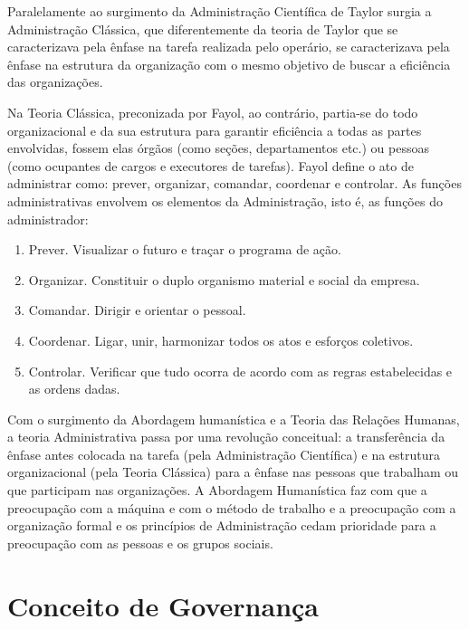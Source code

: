 Paralelamente ao surgimento da Administração Científica de Taylor surgia a 
Administração Clássica, que diferentemente da teoria de Taylor que se caracterizava
pela ênfase na tarefa realizada pelo operário, se caracterizava pela ênfase na 
estrutura da organização com o mesmo objetivo de buscar a eficiência das
organizações.

Na Teoria Clássica, preconizada por Fayol, ao contrário, partia-se do todo 
organizacional e da sua estrutura para garantir eficiência a todas as partes 
envolvidas, fossem elas órgãos (como seções, departamentos etc.) ou pessoas 
(como ocupantes de cargos e executores de tarefas).
%
Fayol define o ato de administrar como: prever, organizar, comandar, coordenar 
e controlar. As funções administrativas envolvem os elementos da Administração, 
isto é, as funções do administrador:\cite{chiavenato2001teoria}

\begin{enumerate}

\item Prever. Visualizar o futuro e traçar o programa de ação.

\item Organizar. Constituir o duplo organismo material e social da empresa.

\item Comandar. Dirigir e orientar o pessoal.

\item Coordenar. Ligar, unir, harmonizar todos os atos e esforços coletivos.

\item Controlar. Verificar que tudo ocorra de acordo com as regras estabelecidas 
e as ordens dadas.

\end{enumerate}

Com o surgimento da Abordagem humanística e a Teoria das Relações Humanas,
a teoria Administrativa passa por uma revolução conceitual: a transferência da 
ênfase antes colocada na tarefa (pela Administração Científica) e na estrutura 
organizacional (pela Teoria Clássica) para a ênfase nas pessoas que trabalham 
ou que participam nas organizações. A Abordagem Humanística faz com que a
preocupação com a máquina e com o método de trabalho e a preocupação com a 
organização formal e os princípios de Administração cedam prioridade para a 
preocupação com as pessoas e os grupos sociais.


\section{Conceito de Governança}

